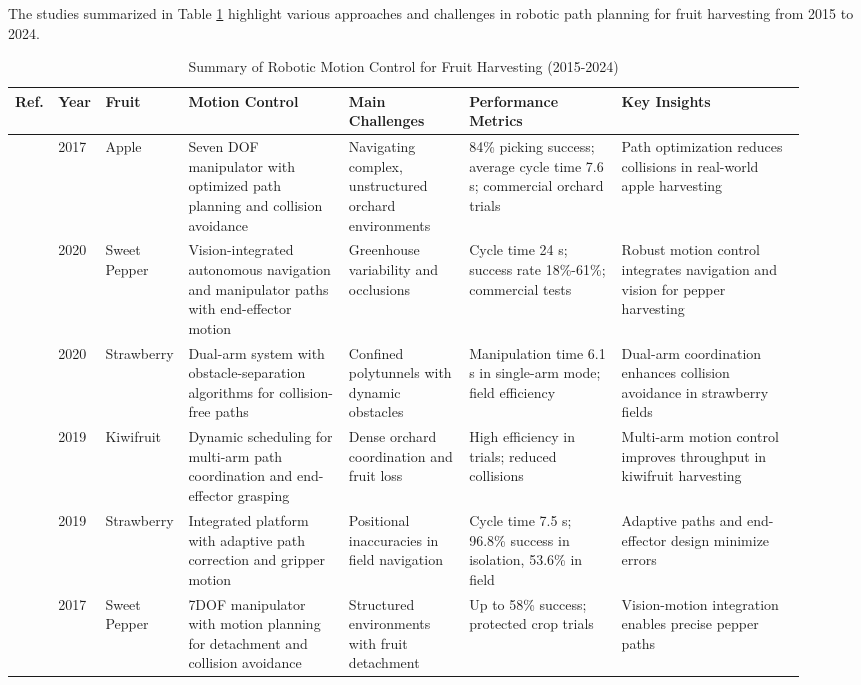 \documentclass{ieeeaccess}
\begin{document}
The studies summarized in Table \ref{tab:motion-control-based} highlight various approaches and challenges in robotic path planning for fruit harvesting from 2015 to 2024.
\iffalse
\begin{table}[htbp]
\centering
\footnotesize
\renewcommand{\arraystretch}{1.2}
\caption{Summary of Robotic Motion Control for Fruit Harvesting (2015-2024)}
\label{tab:motion-control-based}
\begin{tabular}{p{0.04\linewidth} p{0.04\linewidth} p{0.07\linewidth} p{0.20\linewidth} p{0.15\linewidth} p{0.19\linewidth} p{0.23\linewidth}}
\toprule
\textbf{Ref.} & \textbf{Year} & \textbf{Fruit} & \textbf{Motion Control} & \textbf{Main Challenges} & \textbf{Performance Metrics} & \textbf{Key Insights} \\ \midrule
\cite{silwal2017design} & 2017 & Apple & Seven DOF manipulator with optimized path planning and collision avoidance & Navigating complex, unstructured orchard environments & 84\% picking success; average cycle time 7.6 s; commercial orchard trials & Path optimization reduces collisions in real-world apple harvesting \\ \midrule
\cite{arad2020development} & 2020 & Sweet Pepper & Vision-integrated autonomous navigation and manipulator paths with end-effector motion & Greenhouse variability and occlusions & Cycle time 24 s; success rate 18\%-61\%; commercial tests & Robust motion control integrates navigation and vision for pepper harvesting \\ \midrule
\cite{xiong2020autonomous} & 2020 & Strawberry & Dual-arm system with obstacle-separation algorithms for collision-free paths & Confined polytunnels with dynamic obstacles & Manipulation time 6.1 s in single-arm mode; field efficiency & Dual-arm coordination enhances collision avoidance in strawberry fields \\ \midrule
\cite{williams2019robotic} & 2019 & Kiwifruit & Dynamic scheduling for multi-arm path coordination and end-effector grasping & Dense orchard coordination and fruit loss & High efficiency in trials; reduced collisions & Multi-arm motion control improves throughput in kiwifruit harvesting \\ \midrule
\cite{xiong2019development} & 2019 & Strawberry & Integrated platform with adaptive path correction and gripper motion & Positional inaccuracies in field navigation & Cycle time 7.5 s; 96.8\% success in isolation, 53.6\% in field & Adaptive paths and end-effector design minimize errors \\ \midrule
\cite{lehnert2017autonomous} & 2017 & Sweet Pepper & 7DOF manipulator with motion planning for detachment and collision avoidance & Structured environments with fruit detachment & Up to 58\% success; protected crop trials & Vision-motion integration enables precise pepper paths \\ \midrule

\end{tabular}
\end{table}
\end{document}
